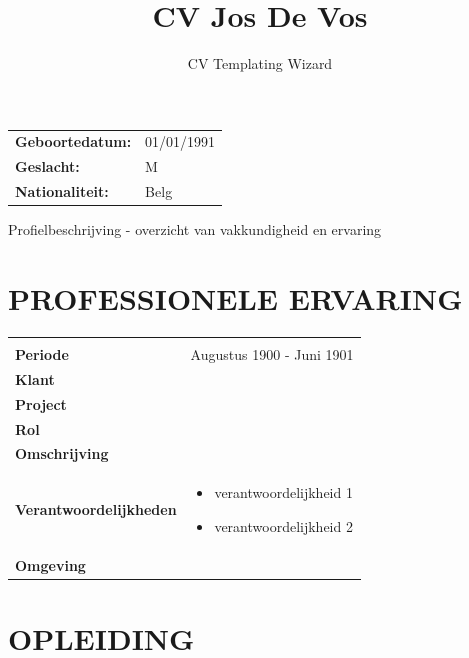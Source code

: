 \documentclass{article}%
\title{CV Jos De Vos}%
\subtitle{CV Templating Wizard}%
\date{}%
\begin{document}
%
\normalsize%
\pagestyle{header}%
\maketitle%
\thispagestyle{fancy}%
\begin{multicols}{2}%
\begin{tabular}{ll}%
\textcolor{cegekablue}{ 
\textbf{Geboortedatum:}
}&01/01/1991\\%
\textcolor{cegekablue}{ 
\textbf{Geslacht:}
}&M\\%
\textcolor{cegekablue}{ 
\textbf{Nationaliteit:}
}&Belg\\%
\end{tabular}%
\columnbreak%
\begin{flushright}%
Profielbeschrijving {-} overzicht van vakkundigheid en ervaring%
\end{flushright}%
\end{multicols}%
\section*{PROFESSIONELE ERVARING}%
\label{sec:PROFESSIONELE ERVARING}%

%
\begin{tabularx}{\textwidth}{g X}%
%
\\%
\textbf{Periode}&Augustus 1900 {-} Juni 1901\\%
\hline%
\textbf{Klant}&\\%
\hline%
\textbf{Project}&\\%
\hline%
\textbf{Rol}&\\%
\hline%
\textbf{Omschrijving}&\\%
\hline%
\textbf{Verantwoordelijkheden}&\begin{itemize}%
\item%
verantwoordelijkheid 1%
\item%
verantwoordelijkheid 2%
\end{itemize}\\%
\hline%
\textbf{Omgeving}&\\%
\hline%
\end{tabularx}%
\section*{OPLEIDING}%
\label{sec:OPLEIDING}%
\end{document}
